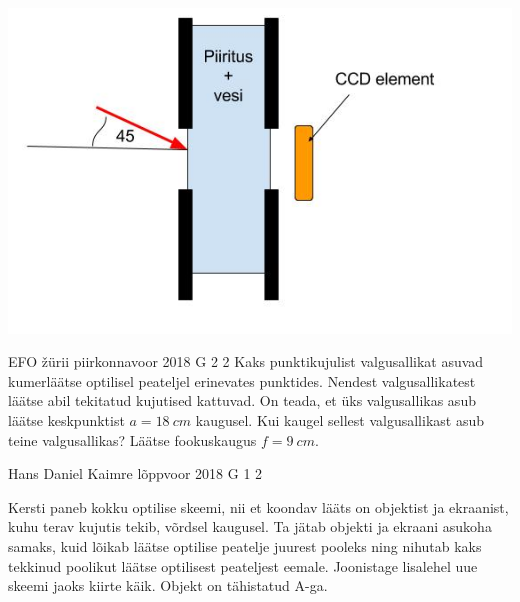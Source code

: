 \documentclass[11pt, twoside]{article}
\begin{document}
{{\begin{center}
	\vspace{-0pt}
	\includegraphics[width=0.5\linewidth]{2017-v2g-04-Piiritusetehas.jpg}
	\vspace{-10pt}
\end{center}
\fi
}

{EFO žürii} %
{piirkonnavoor} %
{2018} %
{G 2} %
{2} %
{
\ifStatement
Kaks punktikujulist valgusallikat asuvad kumerläätse optilisel peateljel erinevates punktides. Nendest valgusallikatest läätse abil tekitatud kujutised kattuvad. On teada, et üks valgusallikas asub läätse keskpunktist $a=\SI{18}{cm}$ kaugusel. Kui kaugel sellest valgusallikast asub teine valgusallikas? Läätse fookuskaugus $f=\SI{9}{cm}$. 
\fi
}

{Hans Daniel Kaimre} %
{lõppvoor} %
{2018} %
{G 1} %
{2} %
{
\ifStatement
Kersti paneb kokku optilise skeemi, nii et koondav lääts on objektist ja ekraanist, kuhu terav kujutis tekib, võrdsel kaugusel. Ta jätab objekti ja ekraani asukoha samaks, kuid lõikab läätse optilise peatelje juurest pooleks ning nihutab kaks tekkinud poolikut läätse optilisest peateljest eemale. Joonistage lisalehel uue skeemi jaoks kiirte käik. Objekt on tähistatud A-ga.
\begin{center}
\end{center}}}
\end{document}
